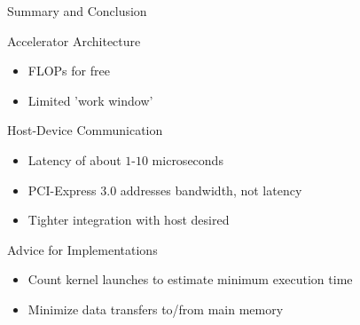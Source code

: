 

%
%














%
%
\begin{frame}{Summary and Conclusion}

 \begin{block}{Accelerator Architecture}
  \begin{itemize}
   \item FLOPs for free
   \item Limited 'work window'
  \end{itemize}
 \end{block}

 \begin{block}{Host-Device Communication}
  \begin{itemize}
   \item Latency of about $1$-$10$ microseconds
   \item PCI-Express 3.0 addresses bandwidth, not latency
   \item Tighter integration with host desired
  \end{itemize}
 \end{block}

 \begin{block}{Advice for Implementations}
  \begin{itemize}
   \item Count kernel launches to estimate minimum execution time
   \item Minimize data transfers to/from main memory
  \end{itemize}
 \end{block}

\end{frame}

